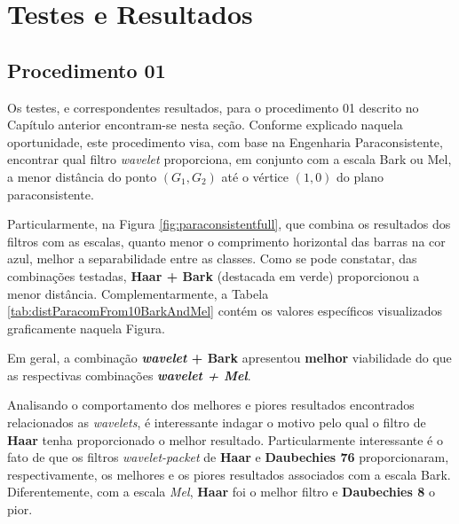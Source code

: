 \chapter{Testes e Resultados} \label{chap:testsResults}
	\section{Procedimento 01}
	\label{chap:testsResults:sec:Experimento01}
	Os testes, e correspondentes resultados, para o procedimento 01 descrito no Capítulo anterior encontram-se nesta seção. Conforme explicado naquela oportunidade, este procedimento visa, com base na Engenharia Paraconsistente, encontrar qual filtro \textit{wavelet} proporciona, em conjunto com a escala Bark ou Mel, a menor distância do ponto $(G_1,G_2)$ até o vértice $(1,0)$ do plano paraconsistente.\\

	\par Particularmente, na Figura \ref{fig:paraconsistentfull}, que combina os resultados dos filtros com as escalas, quanto menor o comprimento horizontal das barras na cor azul, melhor a separabilidade entre as classes. Como se pode constatar, das combinações testadas, \textbf{Haar + Bark} (destacada em verde) proporcionou a menor distância. Complementarmente, a Tabela \ref{tab:distParacomFrom10BarkAndMel} contém os valores específicos visualizados graficamente naquela Figura.\\
	
	\par Em geral, a combinação \textbf{\textit{wavelet} + Bark} apresentou \textbf{melhor} viabilidade do que as respectivas combinações \textbf{\textit{wavelet + Mel}}.\\

	

	\par Analisando o comportamento dos melhores e piores resultados encontrados relacionados as \textit{wavelets}, é interessante indagar o motivo pelo qual o filtro de \textbf{Haar} tenha proporcionado o melhor resultado. Particularmente interessante é o fato de que os filtros \textit{wavelet-packet} de \textbf{Haar} e \textbf{Daubechies 76} proporcionaram, respectivamente, os melhores e os piores resultados associados com a escala Bark. Diferentemente, com a escala \textit{Mel}, \textbf{Haar} foi o melhor filtro e \textbf{Daubechies 8} o pior. \\
	
